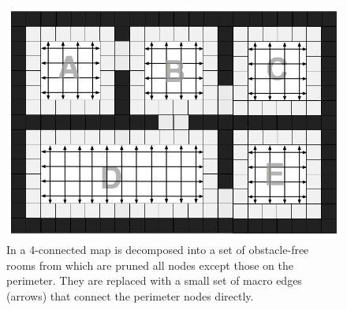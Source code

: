 \begin{figure}[tb]
       \begin{center}
                       \includegraphics[scale=0.30, trim = 10mm 10mm 10mm 0mm]{diagrams/overview.png}
       \end{center}
	\vspace{-3pt}
       \caption{In \cite{harabor10} a 4-connected map is decomposed into a set of obstacle-free rooms from which are pruned all nodes except those on the perimeter.
				They are replaced with a small set of macro edges (arrows) that connect the perimeter nodes directly.}
       \label{fig-overview}
\end{figure}

